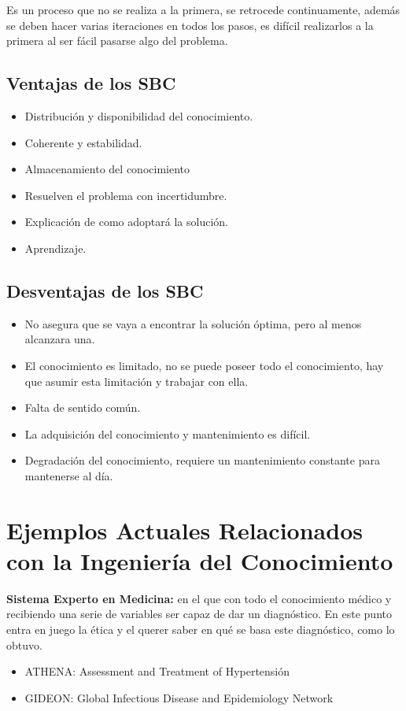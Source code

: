 \documentclass[12pt, twoside, openright]{report} %
\begin{document}
Es un proceso que no se realiza a la primera, se retrocede continuamente, además se deben hacer varias iteraciones en todos los pasos, es difícil realizarlos a la primera al ser fácil pasarse algo del problema.

\subsection{Ventajas de los SBC}
\begin{itemize}
	\item Distribución y disponibilidad del conocimiento.
	\item Coherente y estabilidad.
	\item Almacenamiento del conocimiento
	\item Resuelven el problema con incertidumbre.
	\item Explicación de como adoptará la solución.
	\item Aprendizaje.
\end{itemize}

\subsection{Desventajas de los SBC}
\begin{itemize}
	\item No asegura que se vaya a encontrar la solución óptima, pero al menos alcanzara una.
	\item El conocimiento es limitado, no se puede poseer todo el conocimiento, hay que asumir esta limitación y trabajar con ella.
	\item Falta de sentido común.
	\item La adquisición del conocimiento y mantenimiento es difícil.
	\item Degradación del conocimiento, requiere un mantenimiento constante para mantenerse al día.
\end{itemize}

\section{Ejemplos Actuales Relacionados con la Ingeniería del Conocimiento}
\textbf{Sistema Experto en Medicina:} en el que con todo el conocimiento médico y recibiendo una serie de variables ser capaz de dar un diagnóstico. En este punto entra en juego la ética y el querer saber en qué se basa este diagnóstico, como lo obtuvo.
\begin{itemize}
	\item ATHENA: Assessment and Treatment of Hypertensión
	\item GIDEON: Global Infectious Disease and Epidemiology Network
\end{itemize}
\end{document}
